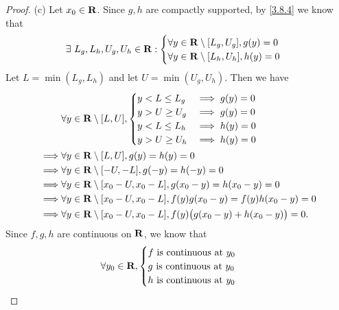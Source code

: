 \begin{proof}{(c)}
  Let \(x_0 \in \mathbf{R}\).
  Since \(g, h\) are compactly supported, by \cref{3.8.4} we know that
  \[
    \exists\ L_g, L_h, U_g, U_h \in \mathbf{R} : \begin{cases}
      \forall y \in \mathbf{R} \setminus [L_g, U_g], g(y) = 0 \\
      \forall y \in \mathbf{R} \setminus [L_h, U_h], h(y) = 0
    \end{cases}
  \]
  Let \(L = \min(L_g, L_h)\) and let \(U = \min(U_g, U_h)\).
  Then we have
  \begin{align*}
             & \forall y \in \mathbf{R} \setminus [L, U], \begin{cases}
                                                    y < L \leq L_g & \implies g(y) = 0 \\
                                                    y > U \geq U_g & \implies g(y) = 0 \\
                                                    y < L \leq L_h & \implies h(y) = 0 \\
                                                    y > U \geq U_h & \implies h(y) = 0
                                                  \end{cases}                      \\
    \implies & \forall y \in \mathbf{R} \setminus [L, U], g(y) = h(y) = 0                                         \\
    \implies & \forall y \in \mathbf{R} \setminus [-U, -L], g(-y) = h(-y) = 0                                     \\
    \implies & \forall y \in \mathbf{R} \setminus [x_0 - U, x_0 - L], g(x_0 - y) = h(x_0 - y) = 0                 \\
    \implies & \forall y \in \mathbf{R} \setminus [x_0 - U, x_0 - L], f(y) g(x_0 - y) = f(y) h(x_0 - y) = 0       \\
    \implies & \forall y \in \mathbf{R} \setminus [x_0 - U, x_0 - L], f(y) \big(g(x_0 - y) + h(x_0 - y)\big) = 0.
  \end{align*}
  Since \(f, g, h\) are continuous on \(\mathbf{R}\), we know that
  \begin{align*}
             & \forall y_0 \in \mathbf{R}, \begin{cases}
                                     f \text{ is continuous at } y_0 \\
                                     g \text{ is continuous at } y_0 \\
                                     h \text{ is continuous at } y_0 \\

\end{cases}
\end{align*}
\end{proof}
